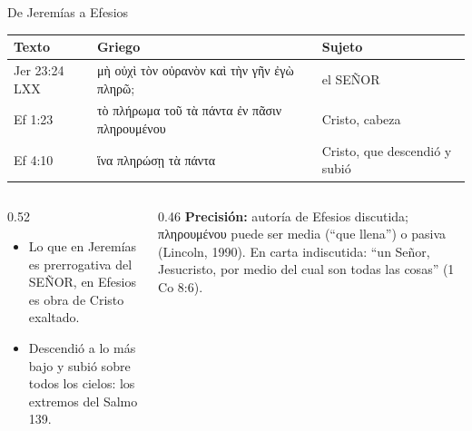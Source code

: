 \documentclass[hyperref={bookmarks=false},aspectratio=169]{beamer}
\newcommand{\grc}[1]{\foreignlanguage{ancientgreek}{#1}}
\newcommand{\SENOR}{S{\fontsize{0.78em}{1em}\selectfont EÑOR}}
\newcommand{\precision}[1]{{\footnotesize\color{gris}\textbf{Precisión:} #1}}
\begin{document}
\begin{frame}{De Jeremías a Efesios}
\scriptsize\renewcommand{\arraystretch}{1.2}
\begin{tabular}{@{}>{\RaggedRight\arraybackslash}p{1.9cm}>{\RaggedRight\arraybackslash}p{6.0cm}>{\RaggedRight\arraybackslash}p{3.9cm}@{}}
\toprule
\textbf{Texto} & \textbf{Griego} & \textbf{Sujeto} \\ \midrule
Jer 23:24 LXX & \grc{μὴ οὐχὶ τὸν οὐρανὸν καὶ τὴν γῆν ἐγὼ πληρῶ;} & el \SENOR \\
Ef 1:23 & \grc{τὸ πλήρωμα τοῦ τὰ πάντα ἐν πᾶσιν πληρουμένου} & Cristo, cabeza \\
Ef 4:10 & \grc{ἵνα πληρώσῃ τὰ πάντα} & Cristo, que descendió y subió \\
\bottomrule
\end{tabular}\par\medskip
\begin{columns}[t,onlytextwidth]
\begin{column}{0.52\textwidth}\small
\begin{itemize}
\item Lo que en Jeremías es prerrogativa del \SENOR, en Efesios es obra de Cristo exaltado.
\item Descendió a lo más bajo y subió sobre todos los cielos: los extremos del Salmo 139.
\end{itemize}
\end{column}
\begin{column}{0.46\textwidth}
\precision{autoría de Efesios discutida; \grc{πληρουμένου} puede ser media (``que llena'') o pasiva (Lincoln, 1990). En carta indiscutida: ``un Señor, Jesucristo, por medio del cual son todas las cosas'' (1 Co 8:6).}
\end{column}
\end{columns}
\end{frame}
\end{document}
